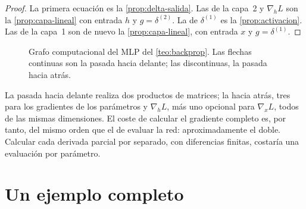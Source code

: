 \begin{proof}
La primera ecuación es la \cref{prop:delta-salida}. Las de la capa~2 y $\nabla_hL$ son la \cref{prop:capa-lineal} con entrada $h$ y $g=\delta^{(2)}$. La de $\delta^{(1)}$ es la \cref{prop:activacion}. Las de la capa~1 son de nuevo la \cref{prop:capa-lineal}, con entrada $x$ y $g=\delta^{(1)}$.
\end{proof}

\begin{figure}[h]
\centering
{}
\caption{Grafo computacional del MLP del \cref{teo:backprop}. Las flechas continuas son la pasada hacia delante; las discontinuas, la pasada hacia atrás.}\label{fig:grafo}
\end{figure}

\begin{observacion}[Coste]
La pasada hacia delante realiza dos productos de matrices; la hacia atrás, tres para los gradientes de los parámetros y $\nabla_hL$, más uno opcional para $\nabla_xL$, todos de las mismas dimensiones. El coste de calcular el gradiente completo es, por tanto, del mismo orden que el de evaluar la red: aproximadamente el doble. Calcular cada derivada parcial por separado, con diferencias finitas, costaría una evaluación por parámetro.
\end{observacion}

\section{Un ejemplo completo}

